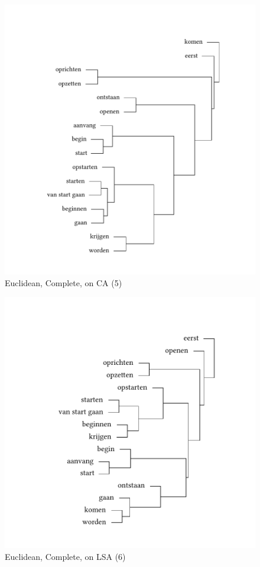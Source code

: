 \begin{figure}
\includegraphics[height=.4\textheight]{figures/tree34.pdf}
\caption{\label{fig:3:34}  Euclidean, Complete, on CA (5)}
\end{figure}

\begin{figure}
\includegraphics[height=.4\textheight]{figures/tree35.pdf}
\caption{\label{fig:3:35}  Euclidean, Complete, on LSA (6)}
\end{figure}

